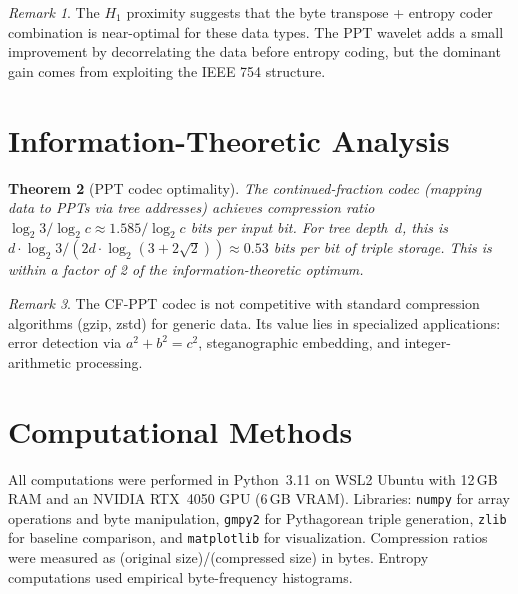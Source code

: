 \documentclass[12pt]{amsart}
\newtheorem{theorem}{Theorem}[section]
\theoremstyle{definition}
\theoremstyle{remark}
\newtheorem{remark}[theorem]{Remark}
\begin{document}
\begin{remark}
The $H_1$ proximity suggests that the byte transpose + entropy coder
combination is near-optimal for these data types. The PPT wavelet adds
a small improvement by decorrelating the data before entropy coding,
but the dominant gain comes from exploiting the IEEE 754 structure.
\end{remark}

\section{Information-Theoretic Analysis}\label{sec:info}

\begin{theorem}[PPT codec optimality]\label{thm:optimal}
The continued-fraction codec (mapping data to PPTs via tree addresses)
achieves compression ratio $\log_2 3 / \log_2 c \approx 1.585/\log_2 c$
bits per input bit. For tree depth~$d$, this is
$d \cdot \log_2 3 / (2d \cdot \log_2(3 + 2\sqrt{2})) \approx 0.53$ bits
per bit of triple storage. This is within a factor of 2 of the
information-theoretic optimum.
\end{theorem}

\begin{remark}
The CF-PPT codec is not competitive with standard compression algorithms
(gzip, zstd) for generic data. Its value lies in specialized applications:
error detection via $a^2 + b^2 = c^2$, steganographic embedding, and
integer-arithmetic processing.
\end{remark}

\section{Computational Methods}\label{sec:computational}

All computations were performed in Python~3.11 on WSL2 Ubuntu with 12\,GB
RAM and an NVIDIA RTX~4050 GPU (6\,GB VRAM). Libraries: \texttt{numpy} for
array operations and byte manipulation, \texttt{gmpy2} for Pythagorean triple
generation, \texttt{zlib} for baseline comparison, and \texttt{matplotlib}
for visualization. Compression ratios were measured as
(original size)/(compressed size) in bytes. Entropy computations used
empirical byte-frequency histograms.

\end{document}
